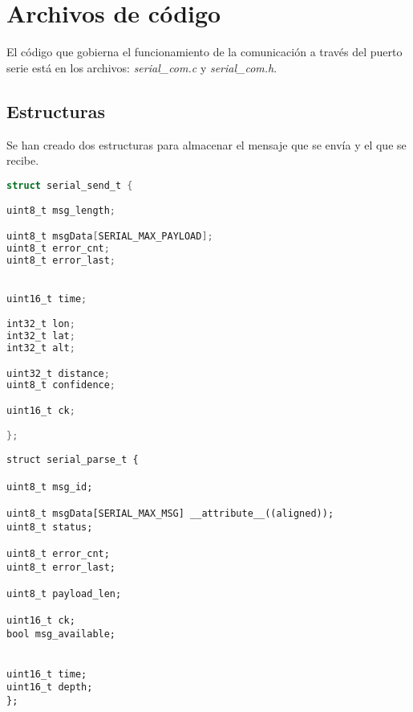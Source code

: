 \section{Archivos de código} \label{sec:3}

El código que gobierna el funcionamiento de la comunicación a través del puerto serie está en los archivos: \textit{serial\_com.c} y \textit{serial\_com.h}.

\subsection{Estructuras}
Se han creado dos estructuras para almacenar el mensaje que se envía y el que se recibe.

\begin{lstlisting}[language=C]
struct serial_send_t {

uint8_t msg_length;

uint8_t msgData[SERIAL_MAX_PAYLOAD];
uint8_t error_cnt;
uint8_t error_last;


uint16_t time;

int32_t lon;
int32_t lat;
int32_t alt;

uint32_t distance;
uint8_t confidence;

uint16_t ck;

};
\end{lstlisting}

\begin{lstlisting}[style=C]
struct serial_parse_t {

uint8_t msg_id;

uint8_t msgData[SERIAL_MAX_MSG] __attribute__((aligned));
uint8_t status;

uint8_t error_cnt;
uint8_t error_last;

uint8_t payload_len;

uint16_t ck;
bool msg_available;


uint16_t time;
uint16_t depth;
};
\end{lstlisting}

